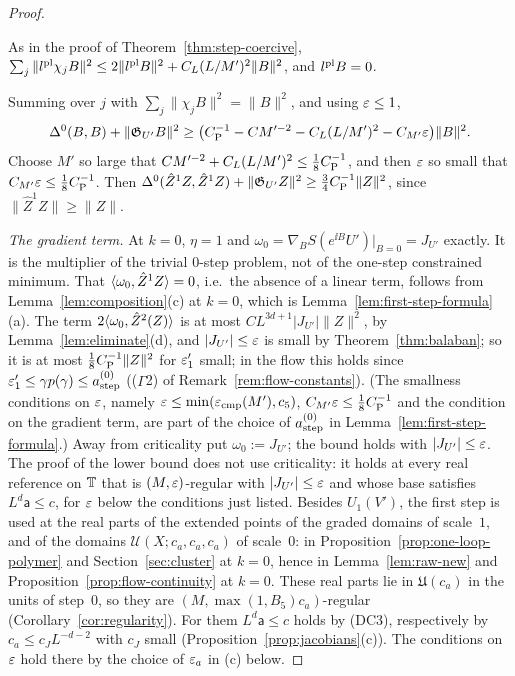 \begin{proof}
\begin{itemize}
\[\]
As in the proof of Theorem~\ref{thm:step-coercive}, $\sum_j\|l^{\rm pl}\chi_jB\|^2\le2\|l^{\rm pl}B\|^2+C_L(L/M')^2\|B\|^2$, and $l^{\rm pl}B=0$.
\end{itemize}
Summing over $j$ with $\sum_j\|\chi_jB\|^2=\|B\|^2$, and using $\varepsilon\le1$,
\[
\Delta^0(B,B)+\|\mathfrak G_{U'}B\|^2\ge\big(C_{\rm P}^{-1}-CM'^{-2}-C_L(L/M')^2-C_{M'}\varepsilon\big)\|B\|^2 .
\]
Choose $M'$ so large that $CM'^{-2}+C_L(L/M')^2\le\frac18C_{\rm P}^{-1}$, and then $\varepsilon$ so small that $C_{M'}\varepsilon\le\frac18C_{\rm P}^{-1}$. Then $\Delta^0(\hat Z^1Z,\hat Z^1Z)+\|\mathfrak G_{U'}Z\|^2\ge\frac34C_{\rm P}^{-1}\|Z\|^2$, since $\|\hat Z^1Z\|\ge\|Z\|$.

\emph{The gradient term.} At $k=0$, $\eta=1$ and $\omega_0=\nabla_BS(e^{\ii B}U')|_{B=0}=J_{U'}$ exactly. It is the multiplier of the trivial $0$-step problem, not of the one-step constrained minimum. That $\langle \omega_0,\hat Z^1Z\rangle=0$, i.e.\ the absence of a linear term, follows from Lemma~\ref{lem:composition}(c) at $k=0$, which is Lemma~\ref{lem:first-step-formula}(a). The term $2\langle \omega_0,\hat Z^2(Z)\rangle$ is at most $CL^{3d+1}|J_{U'}|\|Z\|^2$, by Lemma~\ref{lem:eliminate}(d), and $|J_{U'}|\le\varepsilon$ is small by Theorem~\ref{thm:balaban}; so it is at most $\frac18C_{\rm P}^{-1}\|Z\|^2$ for $\varepsilon'_1$ small; in the flow this holds since $\varepsilon'_1\le\gamma p(\gamma)\le a^{(0)}_{\rm step}$ (($\Gamma$2) of Remark~\ref{rem:flow-constants}). (The smallness conditions on $\varepsilon$, namely $\varepsilon\le\min(\varepsilon_{\rm cmp}(M'),c_5)$, $C_{M'}\varepsilon\le\frac18C_{\rm P}^{-1}$ and the condition on the gradient term, are part of the choice of $a^{(0)}_{\rm step}$ in Lemma~\ref{lem:first-step-formula}.) Away from criticality put $\omega_0:=J_{U'}$; the bound holds with $|J_{U'}|\le\varepsilon$. The proof of the lower bound does not use criticality: it holds at every real reference on $\mathbb T$ that is $(M,\varepsilon)$-regular with $|J_{U'}|\le\varepsilon$ and whose base satisfies $L^d\mathsf a\le c$, for $\varepsilon$ below the conditions just listed. Besides $U_1(V')$, the first step is used at the real parts of the extended points of the graded domains of scale~$1$, and of the domains $\mathcal U(X;c_a,c_a,c_a)$ of scale~$0$: in Proposition~\ref{prop:one-loop-polymer} and Section~\ref{sec:cluster} at $k=0$, hence in Lemma~\ref{lem:raw-new} and Proposition~\ref{prop:flow-continuity} at $k=0$. These real parts lie in $\mathfrak U(c_a)$ in the units of step~$0$, so they are $(M,\max(1,B_5)c_a)$-regular (Corollary~\ref{cor:regularity}). For them $L^d\mathsf a\le c$ holds by (DC3), respectively by $c_a\le c_JL^{-d-2}$ with $c_J$ small (Proposition~\ref{prop:jacobians}(c)). The conditions on $\varepsilon$ hold there by the choice of $\varepsilon_a$ in (c) below.


\end{proof}
